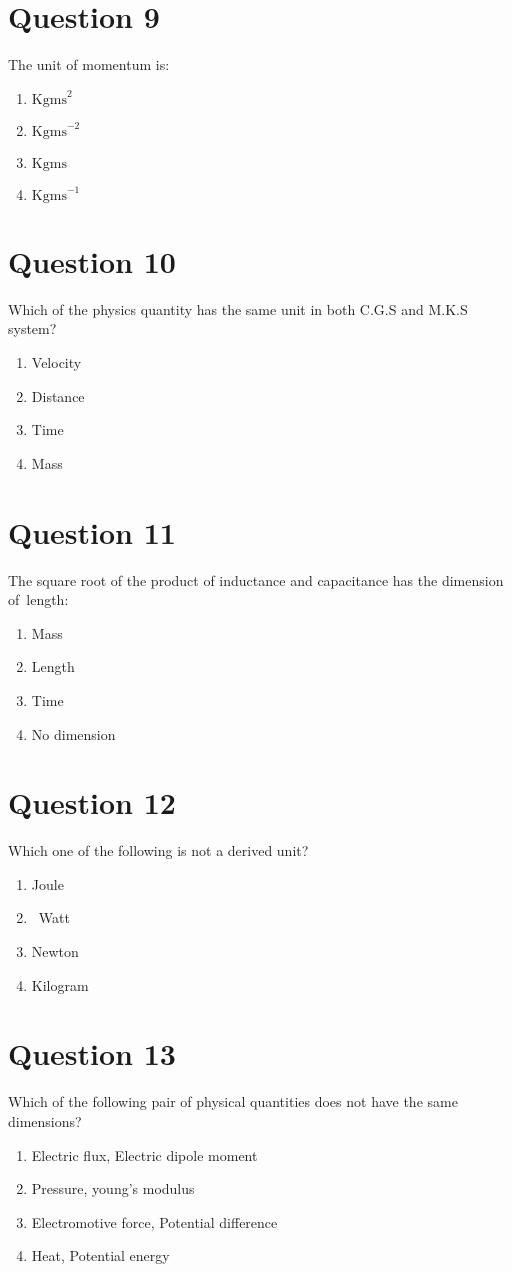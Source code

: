\documentclass{article}
\begin{document}
\section*{Question 9}
The unit of momentum is:
\begin{enumerate}[label=(\alph*)]
\item \(\mathrm{Kgms}^{2}\)
\item \(\mathrm{Kgms}^{-2}\)
\item \(\mathrm{Kgms}\)
\item \(\mathrm{Kgms}^{-1}\)
\end{enumerate}
\newpage
\section*{Question 10}
Which of the physics quantity has the same unit in both C.G.S and M.K.S system?
\begin{enumerate}[label=(\alph*)]
\item Velocity
\item Distance
\item Time
\item Mass
\end{enumerate}
\newpage
\section*{Question 11}
The square root of the product of inductance and capacitance has the dimension of length:
\begin{enumerate}[label=(\alph*)]
\item Mass
\item Length
\item Time
\item No dimension
\end{enumerate}
\newpage
\section*{Question 12}
Which one of the following is not a derived unit?
\begin{enumerate}[label=(\alph*)]
\item Joule
\item  Watt
\item Newton
\item Kilogram
\end{enumerate}
\newpage
\section*{Question 13}
Which of the following pair of physical quantities does not have the same dimensions?
\begin{enumerate}[label=(\alph*)]
\item Electric flux, Electric dipole moment\newline
\item Pressure, young's modulus
\item Electromotive force, Potential difference
\item Heat, Potential energy
\end{enumerate}
\newpage
\end{document}
